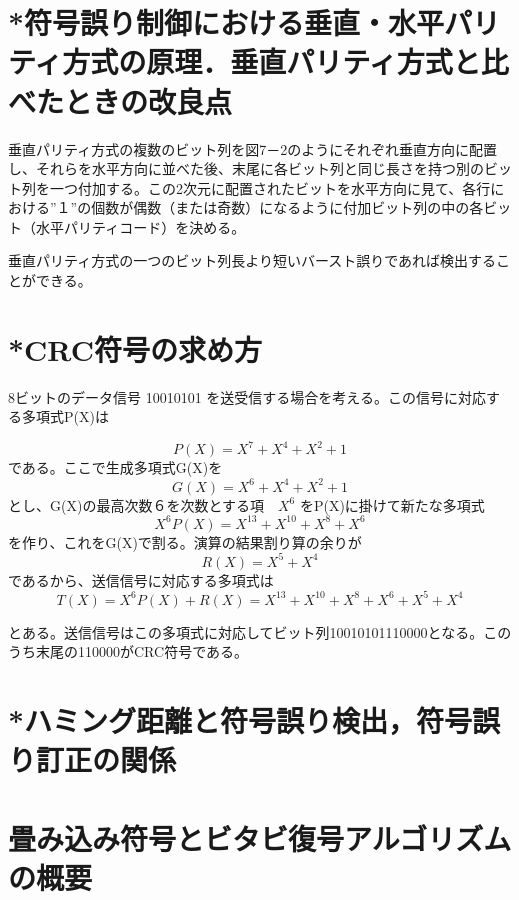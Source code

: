 \documentclass[10.5pt]{jsarticle}
\begin{document}
\section{*符号誤り制御における垂直・水平パリティ方式の原理．垂直パリティ方式と比べたときの改良点}

垂直パリティ方式の複数のビット列を図7－2のようにそれぞれ垂直方向に配置し、それらを水平方向に並べた後、末尾に各ビット列と同じ長さを持つ別のビット列を一つ付加する。この2次元に配置されたビットを水平方向に見て、各行における”１”の個数が偶数（または奇数）になるように付加ビット列の中の各ビット（水平パリティコード）を決める。

垂直パリティ方式の一つのビット列長より短いバースト誤りであれば検出することができる。

\section{*CRC符号の求め方}

8ビットのデータ信号 10010101 を送受信する場合を考える。この信号に対応する多項式P(X)は

\begin{equation}
  P(X) = X^7 + X^4 + X^2 + 1
\end{equation}
である。ここで生成多項式G(X)を
\begin{equation}
 G(X) = X^6 + X^4 + X^2 + 1
\end{equation}
とし、G(X)の最高次数６を次数とする項　$X^6$ をP(X)に掛けて新たな多項式
\begin{equation}
　X^6 P(X) = X^{13} + X^{10} + X^8 + X^6
\end{equation}
を作り、これをG(X)で割る。演算の結果割り算の余りが
\begin{equation}
　R(X) = X^5 + X^4
\end{equation}
であるから、送信信号に対応する多項式は
\begin{equation}
　T(X) = X^6 P(X) + R(X) = X^{13} + X^{10} + X^8 + X^6 + X^5 + X^4
\end{equation}

とある。送信信号はこの多項式に対応してビット列10010101110000となる。このうち末尾の110000がCRC符号である。

\section{*ハミング距離と符号誤り検出，符号誤り訂正の関係}



\section{畳み込み符号とビタビ復号アルゴリズムの概要}
\end{document}
